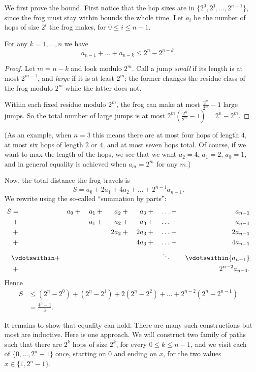 \documentclass[11pt]{scrartcl}
\begin{document}
We first prove the bound.
First notice that the hop sizes
are in $\{2^0, 2^1, \dots, 2^{n - 1}\}$,
since the frog must stay within bounds the whole time.
Let $a_i$ be the number of hops of size $2^i$ the frog makes, for $0\le i\le n - 1$.
\begin{claim*}
  For any $k = 1, \dots, n$ we have
  \[ a_{n-1} + \dots + a_{n-k} \le 2^n - 2^{n-k}. \]
\end{claim*}
\begin{proof}
  Let $m = n-k$ and look modulo $2^m$.
  Call a jump \emph{small} if its length is at most $2^{m-1}$,
  and \emph{large} if it is at least $2^m$;
  the former changes the residue class of the frog modulo $2^m$
  while the latter does not.

  Within each fixed residue modulo $2^m$,
  the frog can make at most $\frac{2^n}{2^m} - 1$ large jumps.
  So the total number of large jumps is at most
  $2^m \left( \frac{2^n}{2^m} - 1 \right) = 2^n - 2^m$.
\end{proof}
(As an example, when $n = 3$ this means there are at most
four hops of length $4$,
at most six hops of length $2$ or $4$,
and at most seven hops total.
Of course, if we want to max the length of the hops,
we see that we want $a_2 = 4$, $a_1 = 2$, $a_0 = 1$,
and in general equality is achieved when $a_m = 2^m$ for any $m$.)

Now, the total distance the frog travels is
\[ S = a_0 + 2a_1 + 4a_2 + \dots + 2^{n-1} a_{n-1}. \]
We rewrite using the so-called ``summation by parts'':
\begin{alignat*}{7}
  S &{}={}& a_0 &{}+{}& a_1 &{}+{}& a_2 &{}+{}& a_3 &{}+{}& \dots &{}+{}& a_{n-1} \\
  &{}+{}& && a_1 &{}+{}& a_2 &{}+{}& a_3 &{}+{}& \dots &{}+{}& a_{n-1} \\
  &{}+{}& && && 2a_2 &{}+{}& 2a_3 &{}+{}& \dots &{}+{}& 2a_{n-1} \\
  &{}+{}& && && && 4a_3 &{}+{}& \dots &{}+{}& 4a_{n-1} \\
  &\vdotswithin+& && && && && \ddots && \vdotswithin{a_{n-1}} \\
  &{}+{}& && && && && && 2^{n-2}a_{n-1}. \\
\end{alignat*}
Hence
\begin{align*}
  S &\le (2^n-2^0) + (2^n-2^1) + 2(2^n-2^2) + \dots + 2^{n-2}(2^n-2^{n-1}) \\
  &= \frac{4^n-1}{3}.
\end{align*}

It remains to show that equality can hold.
There are many such constructions but most are inductive.
Here is one approach.
We will construct two family of paths such that
there are $2^k$ hops of size $2^k$, for every $0\le k\le n - 1$,
and we visit each of $\{0, \dots, 2^n - 1\}$ once,
starting on $0$ and ending on $x$,
for the two values $x\in\{1, 2^n - 1\}$.
\end{document}
